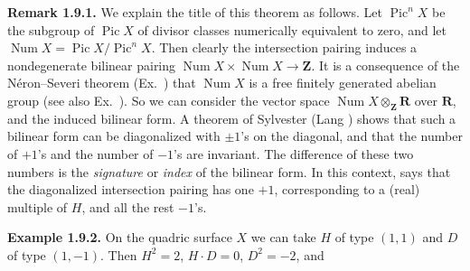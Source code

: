 {\medskip
\noindent\hypertarget{result-V-1.9.1}{}\textbf{Remark 1.9.1.} We explain the title of this theorem as follows. Let $\operatorname{Pic}^n X$ be the subgroup of $\operatorname{Pic}X$ of divisor classes numerically equivalent to zero, and let $\operatorname{Num}X=\operatorname{Pic}X/\operatorname{Pic}^n X$. Then clearly the intersection pairing induces a nondegenerate bilinear pairing $\operatorname{Num}X\times\operatorname{Num}X\to\mathbf Z$. It is a consequence of the N\'eron--Severi theorem (Ex.~) that $\operatorname{Num}X$ is a free finitely generated abelian group (see also Ex.~). So we can consider the vector space $\operatorname{Num}X\otimes_{\mathbf Z}\mathbf R$ over $\mathbf R$, and the induced bilinear form. A theorem of Sylvester (Lang ) shows that such a bilinear form can be diagonalized with $\pm1$'s on the diagonal, and that the number of $+1$'s and the number of $-1$'s are invariant. The difference of these two numbers is the \emph{signature} or \emph{index} of the bilinear form. In this context,  says that the diagonalized intersection pairing has one $+1$, corresponding to a (real) multiple of $H$, and all the rest $-1$'s.

\medskip
\noindent\hypertarget{result-V-1.9.2}{}\textbf{Example 1.9.2.} On the quadric surface $X$  we can take $H$ of type $(1,1)$ and $D$ of type $(1,-1)$. Then $H^2=2$, $H\cdot D=0$, $D^2=-2$, and
}
